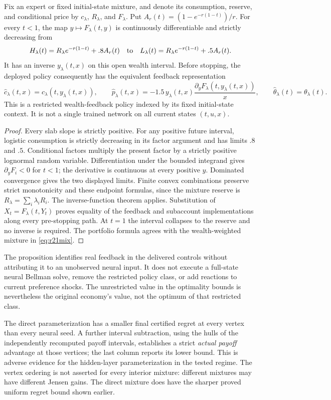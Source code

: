 \begin{proposition}\label{prop:r21markov}
Fix an expert or fixed initial-state mixture, and denote its consumption, reserve, and conditional price by $c_\lambda$, $R_\lambda$, and $F_\lambda$. Put $A_r(t)=(1-e^{-r(1-t)})/r$. For every $t<1$, the map $y\mapsto F_\lambda(t,y)$ is continuously differentiable and strictly decreasing from
\[
 H_\lambda(t)=R_\lambda e^{-r(1-t)}+.8A_r(t)
 \quad\hbox{to}\quad
 L_\lambda(t)=R_\lambda e^{-r(1-t)}+.5A_r(t).
\]
It has an inverse $y_\lambda(t,x)$ on this open wealth interval. Before stopping, the deployed policy consequently has the equivalent feedback representation
\[
 \widehat c_\lambda(t,x)=c_\lambda(t,y_\lambda(t,x)),\qquad
 \widehat p_\lambda(t,x)=-1.5\,y_\lambda(t,x)
 \frac{\partial_yF_\lambda(t,y_\lambda(t,x))}{x},
 \qquad\widehat\theta_\lambda(t)=\theta_\lambda(t).
\]
This is a restricted wealth-feedback policy indexed by its fixed initial-state context. It is not a single trained network on all current states $(t,u,x)$.
\end{proposition}
\begin{proof}
Every slab slope is strictly positive. For any positive future interval, logistic consumption is strictly decreasing in its factor argument and has limits $.8$ and $.5$. Conditional factors multiply the present factor by a strictly positive lognormal random variable. Differentiation under the bounded integrand gives $\partial_yF_i<0$ for $t<1$; the derivative is continuous at every positive $y$. Dominated convergence gives the two displayed limits. Finite convex combinations preserve strict monotonicity and these endpoint formulas, since the mixture reserve is $R_\lambda=\sum_i\lambda_iR_i$. The inverse-function theorem applies. Substitution of $X_t=F_\lambda(t,Y_t)$ proves equality of the feedback and subaccount implementations along every pre-stopping path. At $t=1$ the interval collapses to the reserve and no inverse is required. The portfolio formula agrees with the wealth-weighted mixture in \eqref{eq:r21mix}.
\end{proof}
The proposition identifies real feedback in the delivered controls without attributing it to an unobserved neural input. It does not execute a full-state neural Bellman solve, remove the restricted policy class, or add reactions to current preference shocks. The unrestricted value in the optimality bounds is nevertheless the original economy's value, not the optimum of that restricted class.


The direct parameterization has a smaller final certified regret at every vertex than every neural seed. A further interval subtraction, using the hulls of the independently recomputed payoff intervals, establishes a strict \emph{actual payoff} advantage at those vertices; the last column reports its lower bound. This is adverse evidence for the hidden-layer parameterization in the tested regime. The vertex ordering is not asserted for every interior mixture: different mixtures may have different Jensen gains. The direct mixture does have the sharper proved uniform regret bound shown earlier.

